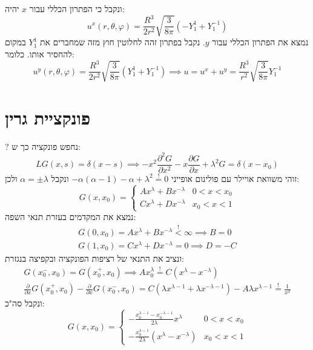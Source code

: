 \documentclass{tstextbook}
\begin{document}
ונקבל כי הפתרון הכללי עבור \(x\) יהיה:
$$u^x\left( r,\theta,\varphi \right)=\frac{R^3}{2r^2}\sqrt{ \frac{3}{8\pi} }(-Y_{1}^1+Y_{1}^{-1})$$
נמצא את הפתרון הכללי עבור \(y\). נקבל בפתרון זהה לחלוטין חוץ מזה שמחברים את \(Y_{1}^1\) במקום להחסיר אותו. כלומר:
$$u^y\left( r,\theta,\varphi \right)=\frac{R^3}{2r^2}\sqrt{ \frac{3}{8\pi} }(Y_{1}^1+Y_{1}^{-1})\implies u=u^x+u^y=\frac{R^3}{r^2}\sqrt{ \frac{3}{8\pi} }Y_{1}^{-1}$$

\section{פונקציית גרין}

?
נחפש פונקציה כך ש:
$$LG(x,s)=\delta(x-s)\implies -x^2\frac{\partial^2 G}{\partial x^2}-x\frac{\partial G}{\partial x}+\lambda^2G=\delta(x-x_{0})$$
זוהי משוואת אויילר עם פולינום אופייני \(-\alpha\left( \alpha-1 \right)-\alpha+\lambda^2\stackrel{!}{=} 0\) ונקבל \(\alpha=\pm \lambda\) ולכן:
$$ G\left(x,x_0\right)=\begin{cases}Ax^{\lambda}+Bx^{-\lambda}&0<x<x_{0}\\Cx^{\lambda}+Dx^{-\lambda}&x_{0}<x<1\end{cases}$$
נמצא את המקדמים בעזרת תנאי השפה:
\begin{gather*} G(0,x_{0}) = Ax^\lambda+Bx^{-\lambda}\stackrel{!}{<}\infty\implies B=0 \\G(1,x_{0})= Cx^\lambda + Dx^{-\lambda}=0\implies D=-C 
\end{gather*}
ונציב את התנאי של רציפות הפונקציה ובקפיצה בנגזרת:
\begin{gather*}G(x_{0}^-,x_{0})=G(x_{0}^+,x_{0})\implies Ax_{0}^\lambda\stackrel{!}{=} C\left( x^\lambda-x^{-\lambda} \right) \\\frac{\partial }{\partial x}G(x_{0}^+,x_{0})-\frac{\partial }{\partial x}G(x_{0}^-,x_{0})=C\left( \lambda x^{\lambda-1}+\lambda x^{-\lambda-1} \right)-A\lambda x^{\lambda-1}\stackrel{!}{=} \frac{1}{x^2}
\end{gather*}
ונקבל סה"כ:
$$ G\left(x,x_0\right)=\begin{cases}-\frac{x_0^{\lambda-1}-x_0^{-\lambda-1}}{2\lambda}x^{\lambda}&0<x<x_0\\-\frac{x_0^{\lambda-1}}{2\lambda}\left(x^{\lambda}-x^{-\lambda}\right)&x_0<x<1\end{cases}$$
\end{document}
